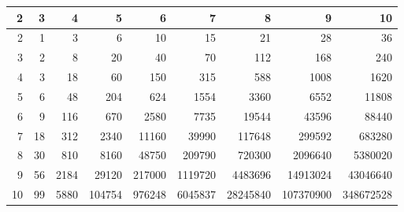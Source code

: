 \begin{tabular}[t]{|r|r|r|r|r|r|r|r|r|}
\hline
2 & 3 & 4 & 5 & 6 & 7 & 8 & 9 & 10\\
\hline
\hline
2 & 1 & 3 & 6 & 10 & 15 & 21 & 28 & 36\\
\hline
3 & 2 & 8 & 20 & 40 & 70 & 112 & 168 & 240\\
\hline
4 & 3 & 18 & 60 & 150 & 315 & 588 & 1008 & 1620\\
\hline
5 & 6 & 48 & 204 & 624 & 1554 & 3360 & 6552 & 11808\\
\hline
6 & 9 & 116 & 670 & 2580 & 7735 & 19544 & 43596 & 88440\\
\hline
7 & 18 & 312 & 2340 & 11160 & 39990 & 117648 & 299592 & 683280\\
\hline
8 & 30 & 810 & 8160 & 48750 & 209790 & 720300 & 2096640 & 5380020\\
\hline
9 & 56 & 2184 & 29120 & 217000 & 1119720 & 4483696 & 14913024 & 43046640\\
\hline
10 & 99 & 5880 & 104754 & 976248 & 6045837 & 28245840 & 107370900 & 348672528\\
\hline
\end{tabular}
